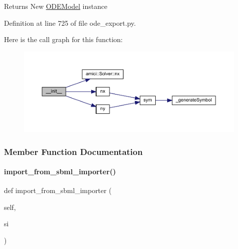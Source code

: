\begin{DoxyReturn}{Returns}
New \mbox{\hyperlink{classamici_1_1ode__export_1_1_o_d_e_model}{O\+D\+E\+Model}} instance 
\end{DoxyReturn}


Definition at line 725 of file ode\+\_\+export.\+py.

Here is the call graph for this function\+:
\nopagebreak
\begin{figure}[H]
\begin{center}
\leavevmode
\includegraphics[width=350pt]{classamici_1_1ode__export_1_1_o_d_e_model_ae64f0875afe3067b97ba370b354b9213_cgraph}
\end{center}
\end{figure}


\subsubsection{Member Function Documentation}
\mbox{\label{classamici_1_1ode__export_1_1_o_d_e_model_a3a3ebfdaf0d1f08adf028afb10d5b5c1}} 
\paragraph{\texorpdfstring{import\+\_\+from\+\_\+sbml\+\_\+importer()}{import\_from\_sbml\_importer()}}
{\footnotesize\ttfamily def import\+\_\+from\+\_\+sbml\+\_\+importer (\begin{DoxyParamCaption}\item[{}]{self,  }\item[{}]{si }\end{DoxyParamCaption})}


